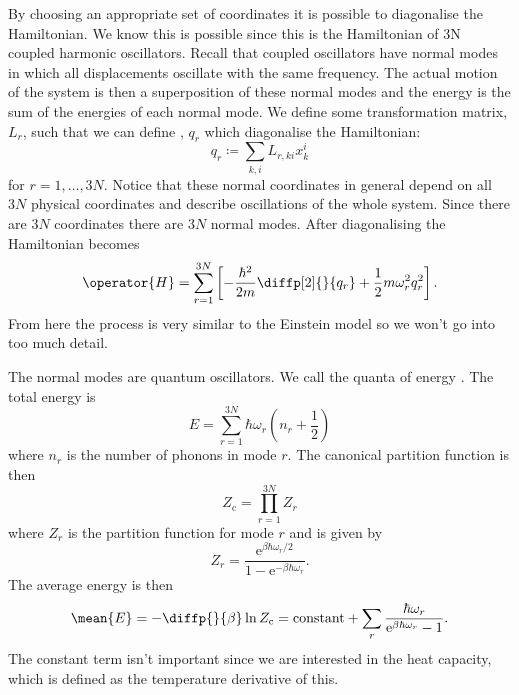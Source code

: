 \documentclass[fleqn]{NotesClass}
\newcommand*{\cpartition}{Z_{\mathrm{c}}}
\newcommand*{\e}{\mathrm{e}}
\begin{document}
    By choosing an appropriate set of coordinates it is possible to diagonalise the Hamiltonian.
    We know this is possible since this is the Hamiltonian of 3N coupled harmonic oscillators.
    Recall that coupled oscillators have normal modes in which all displacements oscillate with the same frequency.
    The actual motion of the system is then a superposition of these normal modes and the energy is the sum of the energies of each normal mode.
    We define some transformation matrix, \(L_r\), such that we can define , \(q_r\) which diagonalise the Hamiltonian:
    \begin{equation}
        q_r \coloneqq \sum_{k,i} L_{r,ki}x_k^i
    \end{equation}
    for \(r = 1, \dotsc, 3N\).
    Notice that these normal coordinates in general depend on all \(3N\) physical coordinates and describe oscillations of the whole system.
    Since there are \(3N\) coordinates there are \(3N\) normal modes.
    After diagonalising the Hamiltonian becomes
    \begin{equation}
        \operator{H} = \sum_{r = 1}^{3N} \left[ -\frac{\hbar^2}{2m} \diffp[2]{}{q_r} + \frac{1}{2}m\omega_r^2q_r^2 \right].
    \end{equation}
    From here the process is very similar to the Einstein model so we won't go into too much detail.
    
    The normal modes are quantum oscillators.
    We call the quanta of energy .
    The total energy is
    \begin{equation}
        E = \sum_{r = 1}^{3N} \hbar\omega_r\left( n_r + \frac{1}{2} \right)
    \end{equation}
    where \(n_r\) is the number of phonons in mode \(r\).
    The canonical partition function is then
    \begin{equation}
        \cpartition = \prod_{r=1}^{3N} Z_r
    \end{equation}
    where \(Z_r\) is the partition function for mode \(r\) and is given by
    \begin{equation}
        Z_r = \frac{\e^{\beta\hbar\omega_r/2}}{1 - \e^{-\beta\hbar\omega_r}}.
    \end{equation}
    The average energy is then
    \begin{equation}
        \mean{E} = -\diffp{}{\beta} \ln \cpartition = \text{constant} + \sum_r \frac{\hbar\omega_r}{\e^{\beta\hbar\omega_r} - 1}.
    \end{equation}
    The constant term isn't important since we are interested in the heat capacity, which is defined as the temperature derivative of this.
    
\end{document}
